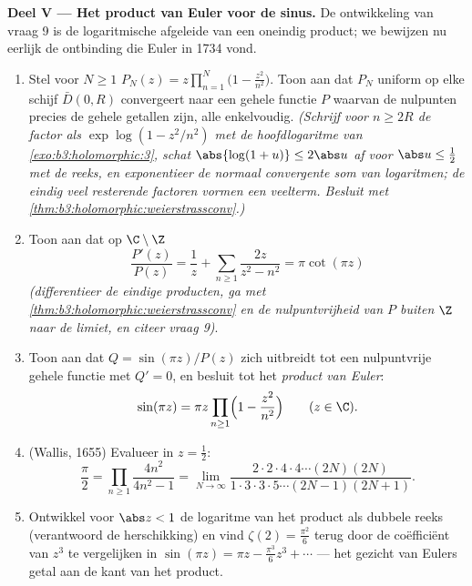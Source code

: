 \begin{problem}
\medskip
\noindent\textbf{Deel V --- Het product van Euler voor de
sinus.} De ontwikkeling van vraag 9 is de logaritmische afgeleide
van een oneindig product; we bewijzen nu eerlijk de ontbinding
die Euler in 1734 vond.
\begin{enumerate}[resume]
  \item Stel voor $N \geq 1$ $P_N(z) = z\prod_{n=1}^{N}\bigl(1 -
        \frac{z^2}{n^2}\bigr)$. Toon aan dat $P_N$ uniform op
        elke schijf $\bar D(0, R)$ convergeert naar een gehele
        functie $P$ waarvan de nulpunten precies de gehele
        getallen zijn, alle enkelvoudig. \emph{(Schrijf voor $n
        \geq 2R$ de factor als $\exp\log(1 - z^2/n^2)$ met de
        hoofdlogaritme van \cref{exo:b3:holomorphic:3}, schat
        $\abs{\log(1+u)} \leq 2\abs u$ af voor $\abs u \leq
        \frac12$ met de reeks, en exponentieer de normaal
        convergente som van logaritmen; de eindig veel resterende
        factoren vormen een veelterm. Besluit met
        \cref{thm:b3:holomorphic:weierstrassconv}.)}
  \item Toon aan dat op $\C\setminus\Z$
        \[
        \frac{P'(z)}{P(z)} = \frac1z +
        \sum_{n\geq1}\frac{2z}{z^2 - n^2} = \pi\cot(\pi z)
        \]
        \emph{(differentieer de eindige producten, ga met
        \cref{thm:b3:holomorphic:weierstrassconv} en de
        nulpuntvrijheid van $P$ buiten $\Z$ naar de limiet, en
        citeer vraag 9)}.
  \item Toon aan dat $Q = \sin(\pi z)/P(z)$ zich uitbreidt tot
        een nulpuntvrije gehele functie met $Q' = 0$, en besluit
        tot het \emph{product van Euler}:
        \[
        \sin(\pi z) = \pi z\prod_{n\geq1}
        \Bigl(1 - \frac{z^2}{n^2}\Bigr)
        \qquad (z \in \C) .
        \]
  \item (Wallis, 1655) Evalueer in $z = \frac12$:
        \[
        \frac\pi2 = \prod_{n\geq1}\frac{4n^2}{4n^2 - 1}
        = \lim_{N\to\infty}
        \frac{2\cdot2\cdot4\cdot4\cdots(2N)(2N)}
        {1\cdot3\cdot3\cdot5\cdots(2N-1)(2N+1)} .
        \]
  \item Ontwikkel voor $\abs z < 1$ de logaritme van het product
        als dubbele reeks (verantwoord de herschikking) en vind
        $\zeta(2) = \frac{\pi^2}6$ terug door de coëfficiënt van
        $z^3$ te vergelijken in $\sin(\pi z) = \pi z -
        \frac{\pi^3}6z^3 + \cdots$ --- het gezicht van Eulers
        getal aan de kant van het product.
\end{enumerate}


\end{problem}
